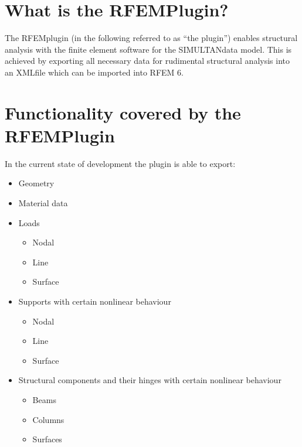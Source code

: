 \documentclass[letterpaper,10pt,english]{jupyterBook}
\begin{document}
\section{What is the RFEM\sphinxhyphen{}Plugin?}
\label{\detokenize{Introduction:what-is-the-rfem-plugin}}
\sphinxAtStartPar
The RFEM\sphinxhyphen{}plugin (in the following referred to as “the plugin”) enables structural analysis with the finite element
software  for the
SIMULTAN\sphinxhyphen{}data model. This is achieved by exporting all necessary data for rudimental structural analysis into an
XML\sphinxhyphen{}file which can be imported into RFEM 6.


\section{Functionality covered by the RFEM\sphinxhyphen{}Plugin}
\label{\detokenize{Introduction:functionality-covered-by-the-rfem-plugin}}
\sphinxAtStartPar
In the current state of development the plugin is able to export:
\begin{itemize}
\item {} 
\sphinxAtStartPar
Geometry

\item {} 
\sphinxAtStartPar
Material data

\item {} 
\sphinxAtStartPar
Loads
\begin{itemize}
\item {} 
\sphinxAtStartPar
Nodal

\item {} 
\sphinxAtStartPar
Line

\item {} 
\sphinxAtStartPar
Surface

\end{itemize}

\item {} 
\sphinxAtStartPar
Supports with certain nonlinear behaviour
\begin{itemize}
\item {} 
\sphinxAtStartPar
Nodal

\item {} 
\sphinxAtStartPar
Line

\item {} 
\sphinxAtStartPar
Surface

\end{itemize}

\item {} 
\sphinxAtStartPar
Structural components and their hinges with certain nonlinear behaviour
\begin{itemize}
\item {} 
\sphinxAtStartPar
Beams

\item {} 
\sphinxAtStartPar
Columns

\item {} 
\sphinxAtStartPar
Surfaces

\end{itemize}

\end{itemize}
\end{document}

